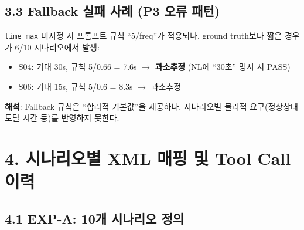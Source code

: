 \documentclass[10pt,a4paper]{article}
\begin{document}
\subsection{3.3 Fallback 실패 사례 (P3 오류 패턴)}

\texttt{time\_max} 미지정 시 프롬프트 규칙 ``5/freq''가 적용되나, ground truth보다 짧은 경우가 6/10 시나리오에서 발생:

\begin{itemize}[nosep]
\item S04: 기대 30s, 규칙 5/0.66 = 7.6s $\rightarrow$ \textbf{과소추정} (NL에 ``30초'' 명시 시 PASS)
\item S06: 기대 15s, 규칙 5/0.6 = 8.3s $\rightarrow$ 과소추정
\end{itemize}

\textbf{해석}: Fallback 규칙은 ``합리적 기본값''을 제공하나, 시나리오별 물리적 요구(정상상태 도달 시간 등)를 반영하지 못한다.

\section{4. 시나리오별 XML 매핑 및 Tool Call 이력}

\subsection{4.1 EXP-A: 10개 시나리오 정의}
\end{document}
